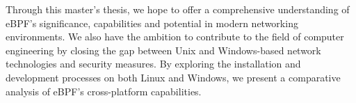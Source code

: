 Through this master's thesis, we hope to offer a comprehensive understanding of eBPF's significance, capabilities and potential in modern networking environments.
We also have the ambition to contribute to the field of computer engineering by closing the gap between Unix and Windows-based network technologies and security measures.
By exploring the installation and development processes on both Linux and Windows, we present a comparative analysis of eBPF's cross-platform capabilities.
